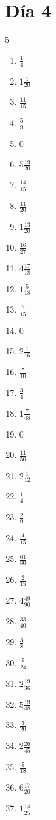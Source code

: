 \documentclass[12pt]{article}
\begin{document}
\section*{Día 4}
\begin{multicols}{5}\begin{enumerate}
\item $ \frac{1}{4} $
\item $ 1 \frac{1}{20} $
\item $ \frac{11}{15} $
\item $ \frac{5}{9} $
\item $ 0 $
\item $ 5 \frac{19}{20} $
\item $ \frac{14}{15} $
\item $ \frac{11}{20} $
\item $ 1 \frac{13}{20} $
\item $ \frac{16}{27} $
\item $ 4 \frac{17}{18} $
\item $ 1 \frac{5}{18} $
\item $ \frac{7}{15} $
\item $ 0 $
\item $ 2 \frac{1}{16} $
\item $ \frac{7}{10} $
\item $ \frac{3}{4} $
\item $ 1 \frac{7}{48} $
\item $ 0 $
\item $ \frac{11}{50} $
\item $ 2 \frac{1}{12} $
\item $ \frac{1}{4} $
\item $ \frac{2}{9} $
\item $ \frac{4}{15} $
\item $ \frac{61}{80} $
\item $ \frac{2}{15} $
\item $ 4 \frac{49}{90} $
\item $ \frac{33}{40} $
\item $ \frac{3}{8} $
\item $ \frac{5}{24} $
\item $ 2 \frac{19}{36} $
\item $ 5 \frac{19}{48} $
\item $ \frac{3}{20} $
\item $ 2 \frac{26}{45} $
\item $ \frac{5}{18} $
\item $ 6 \frac{17}{20} $
\item $ 1 \frac{14}{25} $

\end{enumerate}
\end{multicols}
\end{document}
